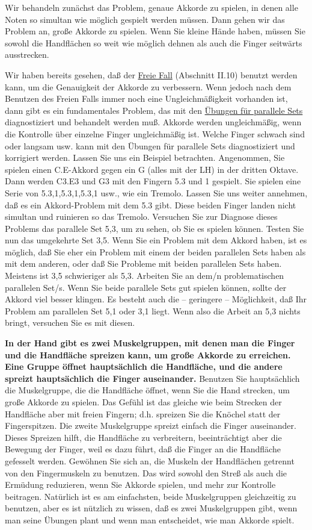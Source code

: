 Wir behandeln zunächst das Problem, genaue Akkorde zu spielen, in denen alle Noten so simultan wie möglich gespielt werden müssen.
Dann gehen wir das Problem an, große Akkorde zu spielen.
Wenn Sie kleine Hände haben, müssen Sie sowohl die Handflächen so weit wie möglich dehnen als auch die Finger seitwärts ausstrecken.

Wir haben bereits gesehen, daß der \hyperref[c1ii10]{Freie Fall} (Abschnitt II.10) benutzt werden kann, um die Genauigkeit der Akkorde zu verbessern.
Wenn jedoch nach dem Benutzen des Freien Falls immer noch eine Ungleichmäßigkeit vorhanden ist, dann gibt es ein fundamentales Problem, das mit den \hyperref[c1iii7b]{Übungen für parallele Sets} diagnostiziert und behandelt werden muß.
Akkorde werden ungleichmäßig, wenn die Kontrolle über einzelne Finger ungleichmäßig ist.
Welche Finger schwach sind oder langsam usw. kann mit den Übungen für parallele Sets diagnostiziert und korrigiert werden.
Lassen Sie uns ein Beispiel betrachten.
Angenommen, Sie spielen einen C.E-Akkord gegen ein G (alles mit der LH) in der dritten Oktave.
Dann werden C3.E3 und G3 mit den Fingern 5.3 und 1 gespielt.
Sie spielen eine Serie von 5.3,1,5.3,1,5.3,1 usw., wie ein Tremolo.
Lassen Sie uns weiter annehmen, daß es ein Akkord-Problem mit dem 5.3 gibt.
Diese beiden Finger landen nicht simultan und ruinieren so das Tremolo.
Versuchen Sie zur Diagnose dieses Problems das parallele Set 5,3, um zu sehen, ob Sie es spielen können.
Testen Sie nun das umgekehrte Set 3,5.
Wenn Sie ein Problem mit dem Akkord haben, ist es möglich, daß Sie eher ein Problem mit einem der beiden parallelen Sets haben als mit dem anderen, oder daß Sie Probleme mit beiden parallelen Sets haben.
Meistens ist 3,5 schwieriger als 5,3.
Arbeiten Sie an dem/n problematischen parallelen Set/s.
Wenn Sie beide parallele Sets gut spielen können, sollte der Akkord viel besser klingen.
Es besteht auch die -- geringere -- Möglichkeit, daß Ihr Problem am parallelen Set 5,1 oder 3,1 liegt.
Wenn also die Arbeit an 5,3 nichts bringt, versuchen Sie es mit diesen.

\textbf{In der Hand gibt es zwei Muskelgruppen, mit denen man die Finger und die Handfläche spreizen kann, um große Akkorde zu erreichen.
Eine Gruppe öffnet hauptsächlich die Handfläche, und die andere spreizt hauptsächlich die Finger auseinander.}
Benutzen Sie hauptsächlich die Muskelgruppe, die die Handfläche öffnet, wenn Sie die Hand strecken, um große Akkorde zu spielen.
Das Gefühl ist das gleiche wie beim Strecken der Handfläche aber mit freien Fingern; d.h. spreizen Sie die Knöchel statt der Fingerspitzen.
Die zweite Muskelgruppe spreizt einfach die Finger auseinander.
Dieses Spreizen hilft, die Handfläche zu verbreitern, beeinträchtigt aber die Bewegung der Finger, weil es dazu führt, daß die Finger an die Handfläche gefesselt werden.
Gewöhnen Sie sich an, die Muskeln der Handflächen getrennt von den Fingermuskeln zu benutzen.
Das wird sowohl den Streß als auch die Ermüdung reduzieren, wenn Sie Akkorde spielen, und mehr zur Kontrolle beitragen.
Natürlich ist es am einfachsten, beide Muskelgruppen gleichzeitig zu benutzen, aber es ist nützlich zu wissen, daß es zwei Muskelgruppen gibt, wenn man seine Übungen plant und wenn man entscheidet, wie man Akkorde spielt.

